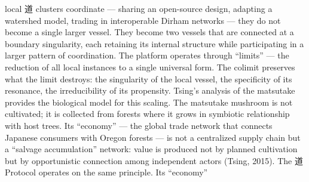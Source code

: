 local 道 clusters coordinate — sharing an open-source design, adapting a watershed model, trading in interoperable Dirham networks — they do not become a single larger vessel. They become two vessels that are connected at a boundary singularity, each retaining its internal structure while participating in a larger pattern of coordination. The platform operates through “limits” — the reduction of all local instances to a single universal form. The colimit preserves what the limit destroys: the singularity of the local vessel, the specificity of its resonance, the irreducibility of its propensity. Tsing’s analysis of the matsutake provides the biological model for this scaling. The matsutake mushroom is not cultivated; it is collected from forests where it grows in symbiotic relationship with host trees. Its “economy” — the global trade network that connects Japanese consumers with Oregon forests — is not a centralized supply chain but a “salvage accumulation” network: value is produced not by planned cultivation but by opportunistic connection among independent actors (Tsing, 2015). The 道 Protocol operates on the same principle. Its “economy”

